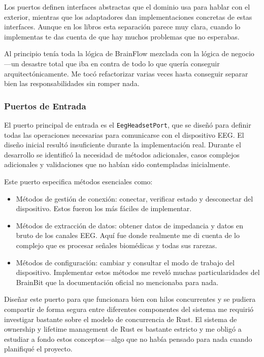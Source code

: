Los puertos definen interfaces abstractas que el dominio usa para hablar con el exterior, mientras que los adaptadores dan implementaciones concretas de estas interfaces. Aunque en los libros esta separación parece muy clara, cuando lo implementas te das cuenta de que hay muchos problemas que no esperabas.

Al principio tenía toda la lógica de BrainFlow mezclada con la lógica de negocio—un desastre total que iba en contra de todo lo que quería conseguir arquitectónicamente. Me tocó refactorizar varias veces hasta conseguir separar bien las responsabilidades sin romper nada.

\subsubsection{Puertos de Entrada}

El puerto principal de entrada es el \texttt{EegHeadsetPort}, que se diseñó para definir todas las operaciones necesarias para comunicarse con el dispositivo EEG. El diseño inicial resultó insuficiente durante la implementación real. Durante el desarrollo se identificó la necesidad de métodos adicionales, casos complejos adicionales y validaciones que no habían sido contempladas inicialmente.

Este puerto especifica métodos esenciales como:

\begin{itemize}
    \item Métodos de gestión de conexión: conectar, verificar estado y desconectar del dispositivo. Estos fueron los más fáciles de implementar.
    \item Métodos de extracción de datos: obtener datos de impedancia y datos en bruto de los canales EEG. Aquí fue donde realmente me di cuenta de lo complejo que es procesar señales biomédicas y todas sus rarezas.
    \item Métodos de configuración: cambiar y consultar el modo de trabajo del dispositivo. Implementar estos métodos me reveló muchas particularidades del BrainBit que la documentación oficial no mencionaba para nada.
\end{itemize}

Diseñar este puerto para que funcionara bien con hilos concurrentes y se pudiera compartir de forma segura entre diferentes componentes del sistema me requirió investigar bastante sobre el modelo de concurrencia de Rust. El sistema de ownership y lifetime management de Rust es bastante estricto y me obligó a estudiar a fondo estos conceptos—algo que no había pensado para nada cuando planifiqué el proyecto.

